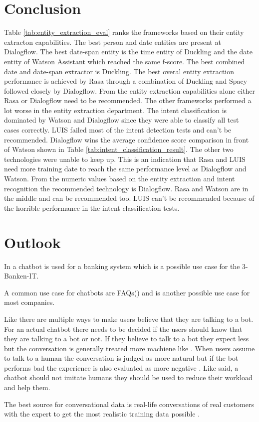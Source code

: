 \section{Conclusion}
Table \ref{tab:entity_extraction_eval} ranks the frameworks based on their 
entity extracton capabilities.
The best person and date entities are present at Dialogflow.
The best date-span entity is the time entity of Duckling 
and the date entity of Watson Assistant which reached the same f-score.
The best combined date and date-span extractor is Duckling.
The best overal entity extraction performance is achieved by Rasa through 
a combination of Duckling and Spacy followed closely by Dialogflow.
From the entity extraction capabilities alone either Rasa or 
Dialogflow need to be recommended.
The other frameworks performed a lot worse in the entity extraction 
department.
The intent classification is dominated by Watson and Dialogflow 
since they were able to classify all test cases correctly.
LUIS failed most of the intent detection tests and can't be 
recommended.
Dialogflow wins the average confidence score comparison in front of Watson 
shown in Table \ref{tab:intent_classification_result}.
The other two technologies were unable to keep up.
This is an indication that Rasa and LUIS need more training date to 
reach the same performance level as Dialogflow and Watson.
From the numeric values based on the entity extraction and intent recognition 
the recommended technology is Dialogflow.
Rasa and Watson are in the middle and can be recommended too.
LUIS can't be recommended because of the horrible performance in 
the intent classification tests.





\section{Outlook}
In \citet{singhbuilding} a chatbot is used for a banking system which is a possible use case for the 3-Banken-IT.

A common use case for chatbots are FAQs(\citet{evaluateChatbotsShawar2007, buiildChatbotsPython, huang2007extracting, GO2019304}) and is another possible use case for most companies.


Like \citet{GO2019304} there are multiple ways to make users believe that they are talking to a bot.
For an actual chatbot there needs to be decided if the users should know that they are talking to a bot or not.
If they believe to talk to a bot they expect less but the conversation is generally treated more machiene like \cite{GO2019304}.
When users assume to talk to a human the conversation is judged as more natural but if the bot performs bad 
the experience is also evaluated as more negative \cite{GO2019304}.
Like \citet{shawar2007chatbots} said, a chatbot should not imitate humans they should be used to 
reduce their workload and help them.

The best source for conversational data is real-life conversations of real customers with the expert to get the most realistic training data possible \cite{singhbuilding}.

